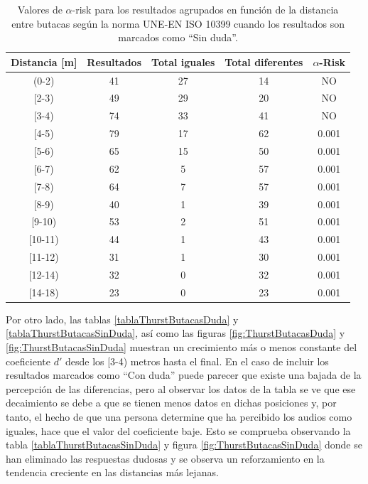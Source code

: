 \documentclass[11pt,a4paper,twoside]{book}
\begin{document}
		    \begin{table}[H]
			\begin{center}
			\begin{scriptsize}
			\begin{tabular}{| c | c | c | c || c |}
			    \hline
				\textbf{Distancia [m]}&\textbf{Resultados}&\textbf{Total iguales}&\textbf{Total diferentes}&\textbf{$\alpha$-Risk}\\ \hline
                (0-2)&41&27&14&NO\\ \hline
                [2-3)&49&29&20&NO\\ \hline
                [3-4)&74&33&41&NO\\ \hline
                [4-5)&79&17&62&0.001\\ \hline
                [5-6)&65&15&50&0.001\\ \hline
                [6-7)&62&5&57&0.001\\ \hline
                [7-8)&64&7&57&0.001\\ \hline
                [8-9)&40&1&39&0.001\\ \hline
                [9-10)&53&2&51&0.001\\ \hline
                [10-11)&44&1&43&0.001\\ \hline
                [11-12)&31&1&30&0.001\\ \hline
                [12-14)&32&0&32&0.001\\ \hline
                [14-18)&23&0&23&0.001\\ \hline
			\end{tabular}
			\caption{Valores de $\alpha$-risk para los resultados agrupados en función de la distancia entre butacas según la norma UNE-EN ISO 10399 cuando los resultados son marcados como ``Sin duda''.}
			\label{tablaISOButacasSinDuda}
			\end{scriptsize}
			\end{center}	
		    \end{table}
            
            \newpage
            Por otro lado, las tablas \ref{tablaThurstButacasDuda} y \ref{tablaThurstButacasSinDuda}, así como las figuras \ref{fig:ThurstButacasDuda} y \ref{fig:ThurstButacasSinDuda} muestran un crecimiento más o menos constante del coeficiente $d'$ desde los [3-4) metros hasta el final. En el caso de incluir los resultados marcados como ``Con duda'' puede parecer que existe una bajada de la percepción de las diferencias, pero al observar los datos de la tabla se ve que ese decaimiento se debe a que se tienen menos datos en dichas posiciones y, por tanto, el hecho de que una persona determine que ha percibido los audios como iguales, hace que el valor del coeficiente baje. Esto se comprueba observando la tabla \ref{tablaThurstButacasSinDuda} y figura \ref{fig:ThurstButacasSinDuda} donde se han eliminado las respuestas dudosas y se observa un reforzamiento en la tendencia creciente en las distancias más lejanas.\newline
            
\end{document}
